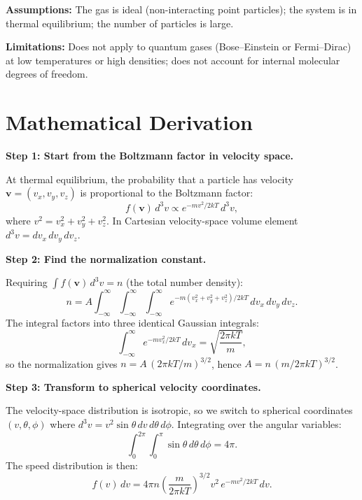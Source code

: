 \textbf{Assumptions:} The gas is ideal (non-interacting point particles); the system is in thermal equilibrium; the number of particles is large.


\textbf{Limitations:} Does not apply to quantum gases (Bose--Einstein or Fermi--Dirac) at low temperatures or high densities; does not account for internal molecular degrees of freedom.


\section*{Mathematical Derivation}

\textbf{Step 1: Start from the Boltzmann factor in velocity space.}

At thermal equilibrium, the probability that a particle has velocity $\mathbf{v} = (v_x, v_y, v_z)$ is proportional to the Boltzmann factor:
\begin{equation}
f(\mathbf{v})\,d^{3}v \propto e^{-mv^{2}/2kT}\,d^{3}v,
\end{equation}
where $v^{2} = v_x^{2} + v_y^{2} + v_z^{2}$. In Cartesian velocity-space volume element $d^{3}v = dv_x\,dv_y\,dv_z$.

\textbf{Step 2: Find the normalization constant.}

Requiring $\int f(\mathbf{v})\,d^{3}v = n$ (the total number density):
\begin{equation}
n = A\int_{-\infty}^{\infty}\!\!\int_{-\infty}^{\infty}\!\!\int_{-\infty}^{\infty} e^{-m(v_x^{2}+v_y^{2}+v_z^{2})/2kT}\,dv_x\,dv_y\,dv_z.
\end{equation}
The integral factors into three identical Gaussian integrals:
\begin{equation}
\int_{-\infty}^{\infty} e^{-mv_x^{2}/2kT}\,dv_x = \sqrt{\frac{2\pi kT}{m}},
\end{equation}
so the normalization gives $n = A\,(2\pi kT/m)^{3/2}$, hence $A = n\,(m/2\pi kT)^{3/2}$.

\textbf{Step 3: Transform to spherical velocity coordinates.}

The velocity-space distribution is isotropic, so we switch to spherical coordinates $(v, \theta, \phi)$ where $d^{3}v = v^{2}\sin\theta\,dv\,d\theta\,d\phi$. Integrating over the angular variables:
\begin{equation}
\int_{0}^{2\pi}\!\!\int_{0}^{\pi} \sin\theta\,d\theta\,d\phi = 4\pi.
\end{equation}
The speed distribution is then:
\begin{equation}
f(v)\,dv = 4\pi n\left(\frac{m}{2\pi kT}\right)^{3/2} v^{2}\,e^{-mv^{2}/2kT}\,dv.
\end{equation}


